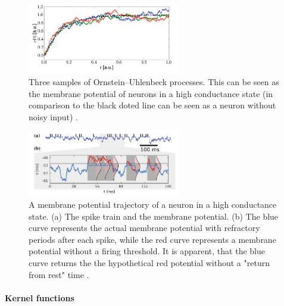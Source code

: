 \begin{figure}
	\centering
    	\includegraphics[width=0.6\textwidth]{imgs/orn_uhl_process.png} 
    \caption[Three samples of Ornstein–Uhlenbeck processes.]{Three samples of Ornstein–Uhlenbeck processes. This can be seen as the membrane potential of neurons in a high conductance state (in comparison to the black doted line can be seen as a neuron without noisy input) \cite{Petrovici2016}.}
	\label{fig:ornuhl}
\end{figure}


\begin{figure}
	\centering
    	\includegraphics[width=0.6\textwidth]{imgs/hcs.png} 
    \caption[A membrane potential trajectory of a neuron in a high conductance state.]{A membrane potential trajectory of a neuron in a high conductance state. (a) The spike train and the membrane potential. (b) The blue curve represents the actual membrane potential with refractory periods after each spike, while the red curve represents a membrane potential without a firing threshold. It is apparent, that the blue curve returns the the hypothetical red potential without a "return from rest" time  \cite{Petrovici2016}. }
	\label{fig:hcs}
\end{figure}


\paragraph{Kernel functions} \label{c:pspkernel}

